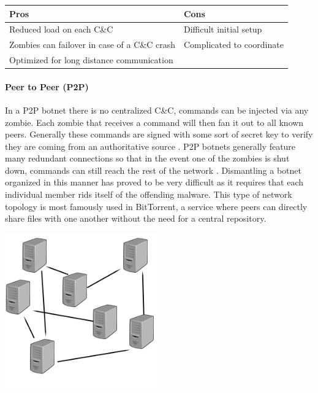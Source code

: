 \begin{tabular}{p{8cm} | p{8cm}}
  \textbf{Pros} & \textbf{Cons} \\ \hline
  \textbullet{}Reduced load on each C\&C                    & \textbullet{}Difficult initial setup \\
  \textbullet{}Zombies can failover in case of a C\&C crash & \textbullet{}Complicated to coordinate\\
  \textbullet{}Optimized for long distance communication    & \\
\end{tabular}

\paragraph{Peer to Peer (P2P) \cite{topology}}
In a P2P botnet there is no centralized C\&C, commands can be injected via any zombie.
Each zombie that receives a command will then fan it out to all known peers.
Generally these commands are signed with some sort of secret key to verify they
are coming from an authoritative source \cite{topology}. P2P botnets generally
feature many redundant connections so that in the event one of the zombies is
shut down, commands can still reach the rest of the network \cite{topology}.
Dismantling a botnet organized in this manner has proved to be very difficult as
it requires that each individual member rids itself of the offending malware.
This type of network topology is most famously used in BitTorrent,
a service where peers can directly share files with one another without the need for a central
repository.

\begin{center}
  \includegraphics[width=0.5\textwidth]{assets/p2ptopo.png}
  \label{fig:p2p_topo_fig}
\end{center}

